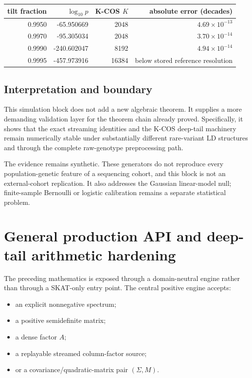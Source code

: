 \documentclass[11pt]{article}
\theoremstyle{definition}
\theoremstyle{remark}
\begin{document}
\begin{center}
\begin{tabular}{rrrr}
\toprule
tilt fraction & $\log_{10}p$ & K-COS $K$ & absolute error (decades)\\
\midrule
0.9950 & -65.950669 & 2048 & $4.69\times10^{-13}$\\
0.9970 & -95.305034 & 2048 & $3.70\times10^{-14}$\\
0.9990 & -240.602047 & 8192 & $4.94\times10^{-14}$\\
0.9995 & -457.973916 & 16384 & below stored reference resolution\\
\bottomrule
\end{tabular}
\end{center}

\subsection{Interpretation and boundary}

This simulation block does not add a new algebraic theorem.  It supplies a
more demanding validation layer for the theorem chain already proved.
Specifically, it shows that the exact streaming identities and the K-COS
deep-tail machinery remain numerically stable under substantially different
rare-variant LD structures and through the complete raw-genotype preprocessing
path.

The evidence remains synthetic.  These generators do not reproduce every
population-genetic feature of a sequencing cohort, and this block is not an
external-cohort replication.  It also addresses the Gaussian linear-model null;
finite-sample Bernoulli or logistic calibration remains a separate statistical
problem.


\section{General production API and deep-tail arithmetic hardening}

The preceding mathematics is exposed through a domain-neutral engine rather
than through a SKAT-only entry point.  The central positive engine accepts:

\begin{itemize}
\item an explicit nonnegative spectrum;
\item a positive semidefinite matrix;
\item a dense factor \(A\);
\item a replayable streamed column-factor source;
\item or a covariance/quadratic-matrix pair
\((\Sigma,M)\).
\end{itemize}
\end{document}
